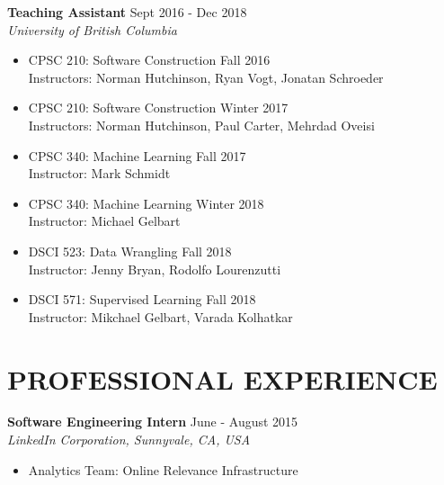 \documentclass[10pt]{res} %
\begin{document}
\textbf{Teaching Assistant} \hfill Sept 2016 - Dec 2018 \\
{\sl University of British Columbia } \\
\begin{itemize}
    \item CPSC 210: Software Construction \hfill Fall 2016 \\
    Instructors: Norman Hutchinson, Ryan Vogt, Jonatan Schroeder
    \item CPSC 210: Software Construction \hfill Winter 2017 \\
    Instructors: Norman Hutchinson, Paul Carter, Mehrdad Oveisi
    \item CPSC 340: Machine Learning \hfill Fall 2017 \\
    Instructor: Mark Schmidt
    \item CPSC 340: Machine Learning \hfill Winter 2018 \\
    Instructor: Michael Gelbart
    \item DSCI 523: Data Wrangling \hfill Fall 2018 \\
    Instructor: Jenny Bryan, Rodolfo Lourenzutti
    \item DSCI 571: Supervised Learning \hfill Fall 2018 \\
    Instructor: Mikchael Gelbart, Varada Kolhatkar
\end{itemize}


\section{PROFESSIONAL EXPERIENCE} 

\vspace{0.2in} %

\textbf{Software Engineering Intern} \hfill June - August 2015 \\
{\sl LinkedIn Corporation, Sunnyvale, CA, USA }
\begin{itemize}  %
    \item Analytics Team: Online Relevance Infrastructure
\end{itemize}
\end{document}
